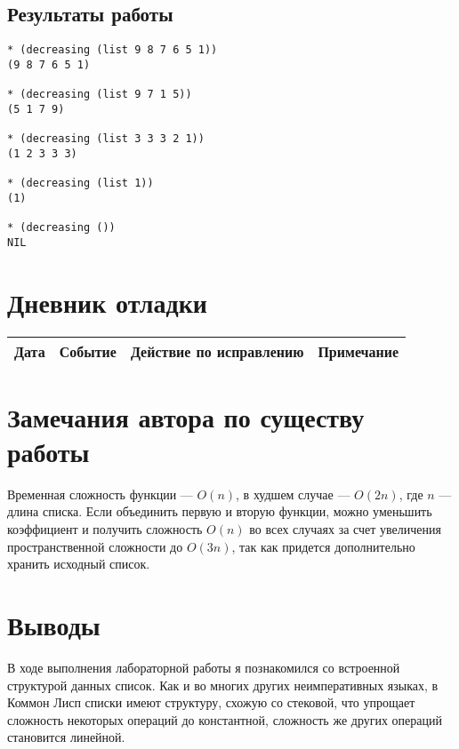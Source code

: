\documentclass[12pt]{article}
\begin{document}
\subsection{Результаты работы}
\begin{lstlisting}
* (decreasing (list 9 8 7 6 5 1))
(9 8 7 6 5 1)

* (decreasing (list 9 7 1 5))
(5 1 7 9)

* (decreasing (list 3 3 3 2 1))
(1 2 3 3 3)

* (decreasing (list 1))
(1)

* (decreasing ())
NIL

\end{lstlisting}

\section{Дневник отладки}
\begin{tabular}{|c|c|c|c|}
\hline
Дата & Событие & Действие по исправлению & Примечание \\
\hline
\end{tabular}

\section{Замечания автора по существу работы}
Временная сложность функции --- $O(n)$, в худшем случае --- $O(2 n)$, где $n$ --- длина списка. Если объединить первую и вторую функции, можно уменьшить коэффициент и получить сложность $O(n)$ во всех случаях за счет увеличения пространственной сложности до $O(3 n)$, так как придется дополнительно хранить исходный список.

\section{Выводы}
В ходе выполнения лабораторной работы я познакомился со встроенной структурой данных список. Как и во многих других неимперативных языках, в Коммон Лисп списки имеют структуру, схожую со стековой, что упрощает сложность некоторых операций до константной, сложность же других операций становится линейной.
\end{document}
